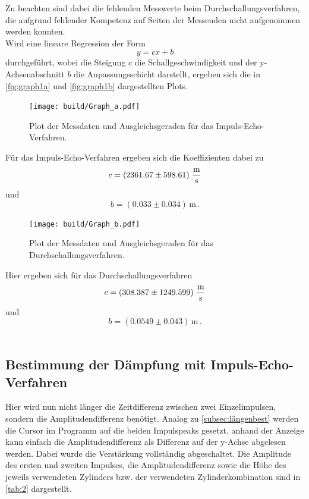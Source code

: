 Zu beachten sind dabei die fehlenden Messwerte beim Durchschallungsverfahren, die aufgrund fehlender Kompetenz auf Seiten der Messenden nicht aufgenommen werden konnten. \\

Wird eine lineare Regression der Form
\begin{equation*}
    y = c x + b
\end{equation*}
durchgeführt, wobei die Steigung $c$ die Schallgeschwindigkeit und der y-Achsenabschnitt $b$ die Anpassungsschicht darstellt, ergeben sich die in \autoref{fig:graph1a} und \autoref{fig:graph1b} dargestellten Plots.
    
\begin{figure}[H]
        \centering
        \texttt{[image: build/Graph\_a.pdf]} 
        \caption{Plot der Messdaten und Ausgleichsgeraden für das Impuls-Echo-Verfahren.}
        \label{fig:graph1a}
\end{figure}

Für das Impuls-Echo-Verfahren ergeben sich die Koeffizienten dabei zu
\begin{equation*}
    c = \left( 2361.67 \pm 598.61 \right) \,\unit{\frac{\meter}{\second}}
\end{equation*}
und
\begin{equation*}
    b = \left( 0.033 \pm 0.034 \right) \,\unit{\meter} \,.
\end{equation*}

\begin{figure}[H]
    \centering
    \texttt{[image: build/Graph\_b.pdf]} 
    \caption{Plot der Messdaten und Ausgleichsgeraden für das Durchschallungsverfahren.}
    \label{fig:graph1b}
\end{figure}

Hier ergeben sich für das Durchschallungsverfahren
\begin{equation*}
    c = \left( 308.387 \pm 1249.599 \right) \,\unit{\frac{\meter}{\second}}
\end{equation*}
und
\begin{equation*}
    b = \left( 0.0549 \pm 0.043 \right)\,\unit{\meter} \,.
\end{equation*} \\


\subsection{Bestimmung der Dämpfung mit Impuls-Echo-Verfahren}

Hier wird nun nicht länger die Zeitdifferenz zwischen zwei Einzelimpulsen, sondern die Amplitudendifferenz benötigt.
Analog zu \autoref{subsec:längenbest} werden die Cursor im Programm auf die beiden Impulspeaks gesetzt, anhand der Anzeige kann einfach die Amplitudendifferenz
als Differenz auf der y-Achse abgelesen werden.
Dabei wurde die Verstärkung vollständig abgeschaltet.
Die Amplitude des ersten und zweiten Impulses, die Amplitudendifferenz sowie die Höhe des jeweils verwendeten Zylinders bzw. 
der verwendeten Zylinderkombination sind in \autoref{tab:2}
dargestellt.


